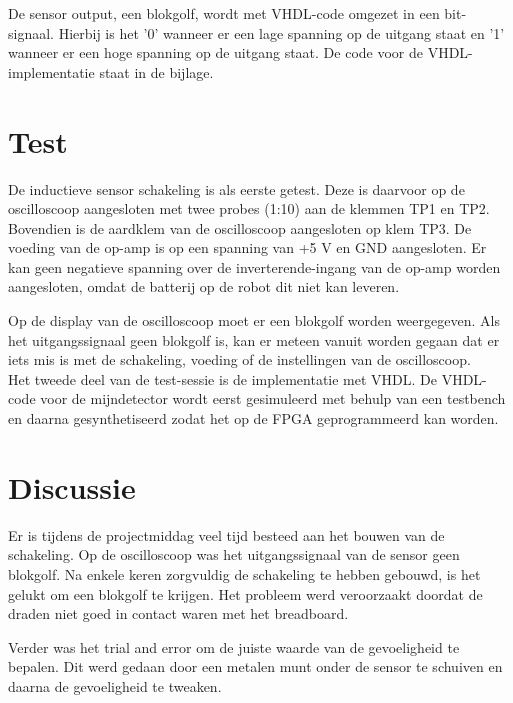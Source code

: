 \documentclass{report}
\begin{document}
De sensor output, een blokgolf, wordt met VHDL-code omgezet in een bit-signaal. Hierbij is het '0' wanneer er een lage spanning op de uitgang staat en '1' wanneer er een hoge spanning op de uitgang staat. De code voor de VHDL-implementatie staat in de bijlage.

\section{Test}
De inductieve sensor schakeling is als eerste getest. Deze is daarvoor op de oscilloscoop aangesloten met twee probes (1:10) aan de klemmen TP1 en TP2. Bovendien is de aardklem van de oscilloscoop aangesloten op klem TP3. De voeding van de op-amp is op een spanning van +5 V en GND aangesloten. Er kan geen negatieve spanning over de inverterende-ingang van de op-amp worden aangesloten, omdat de batterij op de robot dit niet kan leveren. 

Op de display van de oscilloscoop moet er een blokgolf worden weergegeven. Als het uitgangssignaal geen blokgolf is, kan er meteen vanuit worden gegaan dat er iets mis is met de schakeling, voeding of de instellingen van de oscilloscoop.\\

\noindent Het tweede deel van de test-sessie is de implementatie met VHDL. De VHDL-code voor de mijndetector wordt eerst gesimuleerd met behulp van een testbench en daarna gesynthetiseerd zodat het op de FPGA geprogrammeerd kan worden. 

\section{Discussie}
Er is tijdens de projectmiddag veel tijd besteed aan het bouwen van de schakeling. Op de oscilloscoop was het uitgangssignaal van de sensor geen blokgolf. Na enkele keren zorgvuldig de schakeling te hebben gebouwd, is het gelukt om een blokgolf te krijgen. Het probleem werd veroorzaakt doordat de draden niet goed in contact waren met het breadboard.

Verder was het trial and error om de juiste waarde van de gevoeligheid te bepalen. Dit werd gedaan door een metalen munt onder de sensor te schuiven en daarna de gevoeligheid te tweaken.
\end{document}
